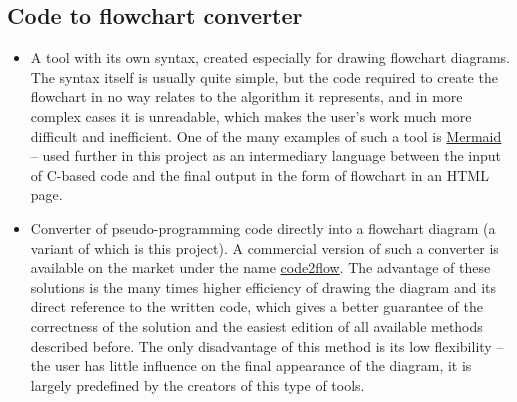 	\subsection{Code to flowchart converter} 	
	\begin{itemize}
	\item
	A tool with its own syntax, created especially for drawing flowchart diagrams. The syntax itself is usually quite simple, but the code required to create the flowchart in no way relates to the algorithm it represents, and in more complex cases it is unreadable, which makes the user's work much more difficult and inefficient. One of the many examples of such a tool is \href{https://mermaid-js.github.io/mermaid/#/}{Mermaid} -- used further in this project as an intermediary language between the input of C-based code and the final output in the form of flowchart in an HTML page.
	
	\item
	Converter of pseudo-programming code directly into a flowchart diagram (a variant of which is this project). A commercial version of such a converter is available on the market under the name \href{https://code2flow.com}{code2flow}. The advantage of these solutions is the many times higher efficiency of drawing the diagram and its direct reference to the written code, which gives a better guarantee of the correctness of the solution and the easiest edition of all available methods described before. The only disadvantage of this method is its low flexibility -- the user has little influence on the final appearance of the diagram, it is largely predefined by the creators of this type of tools.
	\end{itemize}
	
